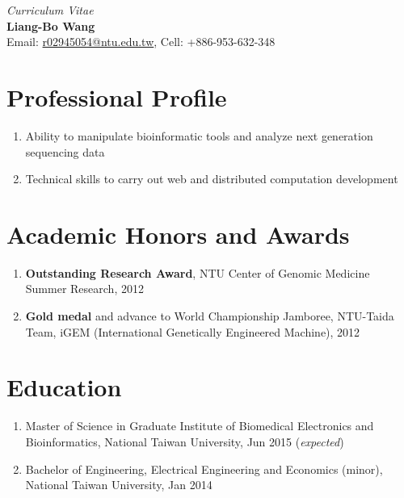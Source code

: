 \documentclass[11pt, a4paper]{scrartcl}
\begin{document}
\begin{centering}
\textit{\Large Curriculum Vitae}\\[1em]
\textbf{\LARGE Liang-Bo Wang} \\[1em]
Email: \href{mailto:r02945054@ntu.edu.tw}{r02945054@ntu.edu.tw}, Cell: +886-953-632-348\\
\end{centering}

\section*{Professional Profile}
\begin{enumerate}
    \item Ability to manipulate bioinformatic tools and analyze next generation sequencing data
    \item Technical skills to carry out web and distributed computation development
\end{enumerate}

\section*{Academic Honors and Awards}
\begin{enumerate}
    \item \textbf{Outstanding Research Award}, NTU Center of Genomic Medicine Summer Research, 2012
    \item \textbf{Gold medal} and advance to World Championship Jamboree, NTU-Taida Team, iGEM (International Genetically Engineered Machine), 2012
\end{enumerate}

\section*{Education}
\begin{enumerate}
    \item Master of Science in Graduate Institute of Biomedical Electronics and Bioinformatics, National Taiwan University, Jun 2015 (\textit{expected})
    \item Bachelor of Engineering, Electrical Engineering and Economics (minor), National Taiwan University, Jan 2014
\end{enumerate}
\end{document}
